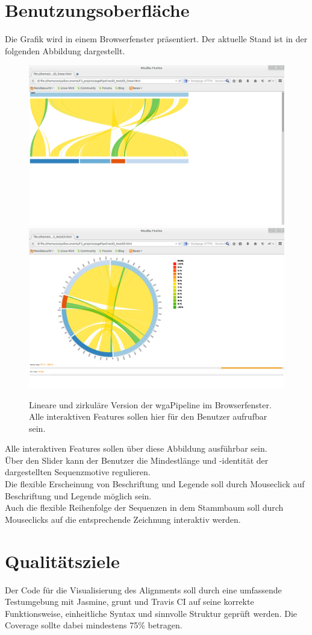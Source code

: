 \documentclass[a4paper]{scrreprt}
\begin{document}
\chapter{Benutzungsoberfläche}
Die Grafik wird in einem Browserfenster präsentiert. Der aktuelle Stand ist in der folgenden Abbildung dargestellt.
\begin{figure}[h]
  \centering
  \includegraphics[width=11.5cm]{figures/linear.png}
  \includegraphics[width=11.5cm]{figures/circular.png}
  \caption{Lineare und zirkuläre Version der wgaPipeline im Browserfenster. Alle interaktiven Features sollen hier für den Benutzer aufrufbar sein.}
\end{figure}

Alle interaktiven Features sollen über diese Abbildung ausführbar sein.\\
Über den Slider kann der Benutzer die Mindestlänge und -identität der dargestellten Sequenzmotive regulieren.\\
Die flexible Erscheinung von Beschriftung und Legende soll durch Mouseclick auf Beschriftung und Legende möglich sein.\\
Auch die flexible Reihenfolge der Sequenzen in dem Stammbaum soll durch Mouseclicks auf die entsprechende Zeichnung interaktiv werden.




\chapter{Qualitätsziele}
Der Code für die Visualisierung des Alignments soll durch eine umfassende Testumgebung mit Jasmine, grunt und Travis CI auf seine korrekte Funktionsweise, einheitliche Syntax und sinnvolle Struktur geprüft werden. Die Coverage sollte dabei mindestens 75\% betragen.
 
\listoffigures
 
\end{document}
